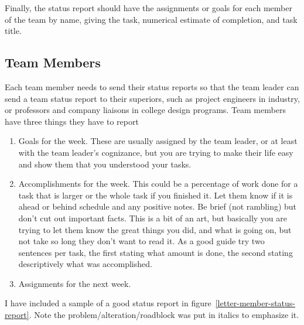 Finally, the status report should have the assignments or goals for each member of the team by name, giving the task, numerical estimate of completion, and task title.

\subsection{Team Members}

Each team member needs to send their status reports so that the team leader can send a team status report to their superiors, such as project engineers in industry, or professors and company liaisons in college design programs.  Team members have three things they have to report
\begin{enumerate}
\item Goals for the week.  These are usually assigned by the team leader, or at least with the team leader's cognizance, but you are trying to make their life easy and show them that you understood your tasks.
\item  Accomplishments for the week.  This could be a percentage of work done for a task that is larger or the whole task if you finished it.  Let them know if it is ahead or behind schedule and any positive notes.  Be brief (not rambling) but don't cut out important facts.  This is a bit of an art, but basically you are trying to let them know the great things you did, and what is going on, but not take so long they don't want to read it.  As a good guide try two sentences per task, the first stating what amount is done, the second stating descriptively what was accomplished.
\item Assignments for the next week.
\end{enumerate}
I have included a sample of a good status report in figure~\ref{letter-member-status-report}.  Note the problem/alteration/roadblock was put in italics to emphasize it.

